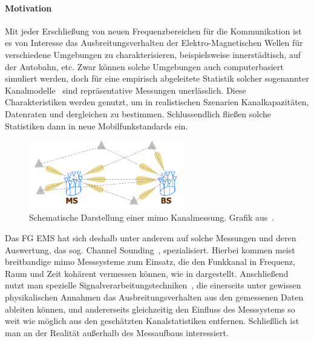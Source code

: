 %
\paragraph{Motivation}
%
%
Mit jeder Erschlie{\ss}ung von neuen Frequenzbereichen f\"ur die Kommunikation ist es von Interesse das Ausbreitungsverhalten der Elektro-Magnetischen Wellen f\"ur verschiedene Umgebungen zu charakterisieren, beispielsweise innerst\"adtisch, auf der Autobahn, etc.
Zwar k\"onnen solche Umgebungen auch computerbasiert simuliert werden, doch f\"ur eine empirisch abgeleitete Statistik solcher sogenannter Kanalmodelle~\cite{delgaldo2007phd} sind repr\"asentative Messungen unerl\"asslich. 
Diese Charakteristiken werden genutzt, um in realistischen Szenarien Kanalkapazit\"aten, Datenraten und dergleichen zu bestimmen. 
Schlussendlich flie{\ss}en solche Statistiken dann in neue Mobilfunkstandards ein.

\begin{figure}
    \centering\includegraphics[width=0.6\textwidth]{img/eadf/sounding.png}
    \caption{Schematische Darstellung einer \acrshort{mimo} Kanalmessung. Grafik aus~\cite{richter_estimation_2005}.}\label{eadf_sounding}
\end{figure}

Das FG EMS hat sich deshalb unter anderem auf solche Messungen und deren Auswertung, das sog. Channel Sounding~\cite{thomae2005multidim_hrpe}, spezialisiert. Hierbei kommen meist breitbandige \gls{mimo} Messsysteme zum Einsatz, die den Funkkanal in Frequenz, Raum und Zeit koh\"arent vermessen k\"onnen, wie in  dargestellt. Anschlie{\ss}end nutzt man spezielle Signalverarbeitungstechniken~\cite{semper2023wideband_channel_sounding}, die einerseits unter gewissen physikalischen Annahmen das Ausbreitungsverhalten aus den gemessenen Daten ableiten k\"onnen, und andererseits gleichzeitig den Einfluss des Messsystems so weit wie m\"oglich aus den gesch\"atzten Kanalstatistiken entfernen. Schlie{\ss}lich ist man an der Realit\"at au{\ss}erhalb des Messaufbaus interessiert. 

